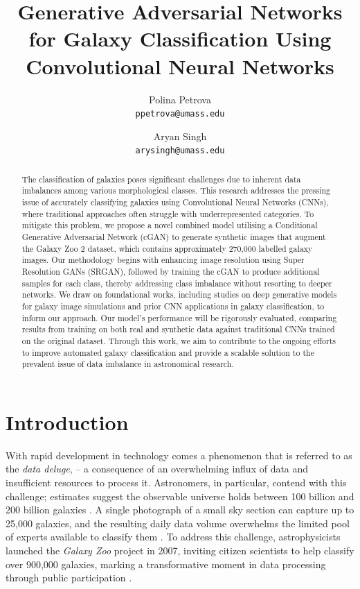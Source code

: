 \documentclass[10pt,twocolumn,letterpaper]{article}
\title{Generative Adversarial Networks for Galaxy Classification Using Convolutional
Neural Networks}
\author{Polina Petrova\\
{\tt\small ppetrova@umass.edu}
\and
Aryan Singh\\
{\tt\small arysingh@umass.edu}
}
\begin{document}
\maketitle
\begin{abstract}
    The classification of galaxies poses significant challenges due to inherent data imbalances among various morphological classes. 
    This research addresses the pressing issue of accurately classifying galaxies using Convolutional Neural Networks (CNNs), where traditional approaches often struggle with underrepresented categories. 
    To mitigate this problem, we propose a novel combined model utilising a Conditional Generative Adversarial Network (cGAN) to generate synthetic images that augment the Galaxy Zoo 2 dataset, which contains approximately 270,000 labelled galaxy images. 
    Our methodology begins with enhancing image resolution using Super Resolution GANs (SRGAN), followed by training the cGAN to produce additional samples for each class, thereby addressing class imbalance without resorting to deeper networks. 
    We draw on foundational works, including studies on deep generative models for galaxy image simulations and prior CNN applications in galaxy classification, to inform our approach. 
    Our model's performance will be rigorously evaluated, comparing results from training on both real and synthetic data against traditional CNNs trained on the original dataset. 
    Through this work, we aim to contribute to the ongoing efforts to improve automated galaxy classification and provide a scalable solution to the prevalent issue of data imbalance in astronomical research.
\end{abstract}

\section{Introduction}
With rapid development in technology comes a phenomenon that is referred to as the \textit{data deluge}, – a consequence of an overwhelming influx of data and insufficient resources to process it. 
Astronomers, in particular, contend with this challenge; estimates suggest the observable universe holds between 100 billion and 200 billion galaxies \cite{Howell2018}.
A single photograph of a small sky section can capture up to 25,000 galaxies, and the resulting daily data volume overwhelms the limited pool of experts available to classify them \cite{Sauers2023}.
To address this challenge, astrophysicists launched the \textit{Galaxy Zoo} project in 2007, inviting citizen scientists to help classify over 900,000 galaxies, marking a transformative moment in data processing through public participation \cite{McGourty2007}.
\end{document}
